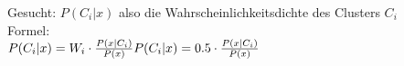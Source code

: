 \documentclass[14pt]{article}
\begin{document}
Gesucht: $P(C_i | x)$ also die Wahrscheinlichkeitsdichte des Clusters $C_i$ \\
Formel: \\
$
    P(C_i | x) = W_i \cdot \frac{P(x | C_i)}{P(x)} \\
    P(C_i | x) = 0.5 \cdot \frac{P(x | C_i)}{P(x)} 
$
\end{document}
